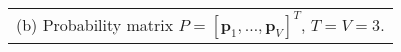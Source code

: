 \scriptsize
\begin{tabular}[t]{l}
	(b) Probability matrix $P = [\bm{p}_1, \ldots, \bm{p}_V]^T$, $T=V=3$.
\end{tabular}